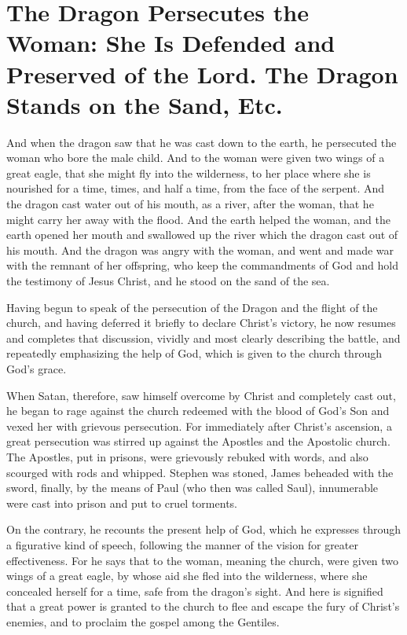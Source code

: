 \chapter[Sermon 54. The Dragon Persecutes the Woman: She Is Defended and Preserved of the Lord. The Dragon Stands on the Sand, Etc.]{The Dragon Persecutes the Woman: She Is Defended and Preserved of the Lord. The Dragon Stands on the Sand, Etc.}
\label{sermon:054}

And when the dragon saw that he was cast down to the earth, he persecuted the woman who bore the male child. And to the woman were given two wings of a great eagle, that she might fly into the wilderness, to her place where she is nourished for a time, times, and half a time, from the face of the serpent. And the dragon cast water out of his mouth, as a river, after the woman, that he might carry her away with the flood. And the earth helped the woman, and the earth opened her mouth and swallowed up the river which the dragon cast out of his mouth. And the dragon was angry with the woman, and went and made war with the remnant of her offspring, who keep the commandments of God and hold the testimony of Jesus Christ, and he stood on the sand of the sea.

Having begun to speak of the persecution of the Dragon and the flight of the church, and having deferred it briefly to declare Christ’s victory, he now resumes and completes that discussion, vividly and most clearly describing the battle, and repeatedly emphasizing the help of God, which is given to the church through God’s grace.

When Satan, therefore, saw himself overcome by Christ and completely cast out, he began to rage against the church redeemed with the blood of God’s Son and vexed her with grievous persecution. For immediately after Christ’s ascension, a great persecution was stirred up against the Apostles and the Apostolic church. The Apostles, put in prisons, were grievously rebuked with words, and also scourged with rods and whipped. Stephen was stoned, James beheaded with the sword, finally, by the means of Paul (who then was called Saul), innumerable were cast into prison and put to cruel torments.

On the contrary, he recounts the present help of God, which he expresses through a figurative kind of speech, following the manner of the vision for greater effectiveness. For he says that to the woman, meaning the church, were given two wings of a great eagle, by whose aid she fled into the wilderness, where she concealed herself for a time, safe from the dragon’s sight. And here is signified that a great power is granted to the church to flee and escape the fury of Christ’s enemies, and to proclaim the gospel among the Gentiles.

